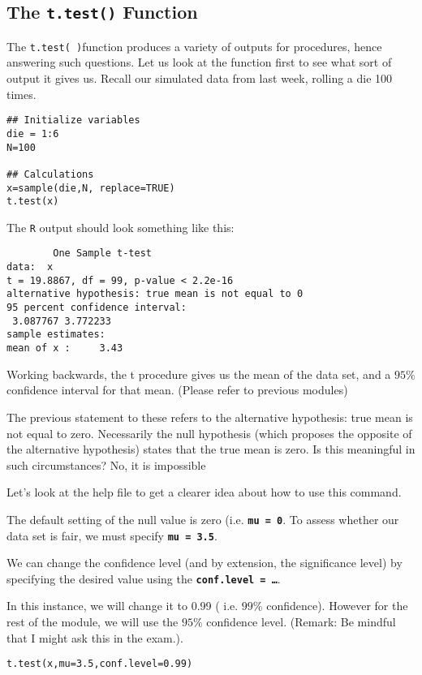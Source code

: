 \subsection{The \texttt{t.test()} Function}
The \texttt{t.test( )}function produces a variety of  outputs for procedures, hence answering such questions. Let us look at the function first to see what sort of output it gives us.
Recall our simulated data from last week, rolling a die 100 times.

\begin{framed}
\begin{verbatim}
## Initialize variables
die = 1:6
N=100

## Calculations
x=sample(die,N, replace=TRUE)
t.test(x)
\end{verbatim}
\end{framed}
The \texttt{R} output should look something like this:
\begin{verbatim}
        One Sample t-test
data:  x
t = 19.8867, df = 99, p-value < 2.2e-16
alternative hypothesis: true mean is not equal to 0
95 percent confidence interval:
 3.087767 3.772233
sample estimates:
mean of x :     3.43
\end{verbatim}

Working backwards, the t procedure gives us the mean of the data set, and a $95\%$ confidence interval for that mean.  (Please refer to previous modules)

The previous statement to these refers to the alternative hypothesis: true mean is not equal to zero. Necessarily the null hypothesis (which proposes the opposite of the alternative hypothesis) states that the true mean is zero.
Is this meaningful in such circumstances? No, it is impossible

Let’s look at the help file to get a clearer idea about how to use this command.

The default setting of the null value is zero (i.e. \textbf{\texttt{mu = 0}}. To assess whether our data set is fair, we must specify \textbf{\texttt{mu = 3.5}}.

We can change the confidence level (and by extension,  the significance level)  by specifying the desired value using the \textbf{\texttt{conf.level = …}}.

In this instance, we will change it to 0.99 ( i.e. $99\%$ confidence). However for the rest of the module, we will use the $95\%$ confidence level. (Remark: Be mindful that I might ask this in the exam.).

\begin{framed}
\begin{verbatim}
t.test(x,mu=3.5,conf.level=0.99)
\end{verbatim}
\end{framed}

